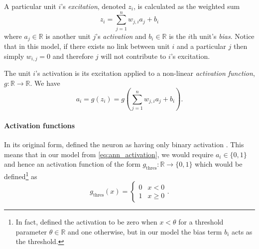 A particular unit $i$'s \textit{excitation}, denoted $z_i$, is calculated as the weighted sum
\begin{equation}
    z_i = \sum_{j=1}^n{w_{j,i} a_j} + b_i
\end{equation}
where $a_j \in \mathbb{R}$ is another unit $j$'s \textit{activation} and $b_i \in \mathbb{R}$ is the $i$th unit's \textit{bias}.
Notice that in this model, if there exists no link between unit $i$ and a particular $j$ then simply $w_{i,j}=0$ and therefore $j$ will not contribute to $i$'s excitation. 

The unit $i$'s activation is its excitation applied to a non-linear \textit{activation function}, $g: \mathbb{R} \rightarrow \mathbb{R}$. We have
\begin{equation}
    \label{eq:ann_activation}
    a_i = g\left(z_i\right) = g\left(\sum_{j=1}^n{w_{j,i} a_j} + b_i\right).
\end{equation}

\paragraph{Activation functions}
In its original form, \citeauthor{mcculloch1943} defined the neuron as having only binary activation \cite*{mcculloch1943}. 
This means that in our model from \ref{eq:ann_activation}, we would require $a_i \in \{0, 1\}$ and hence an activation function of the form $g_\text{thres}: \mathbb{R} \rightarrow \{0, 1\}$ which would be defined\footnote{In fact, \citeauthor{mcculloch1943} defined the activation to be zero when $x<\theta$ for a threshold parameter $\theta \in \mathbb{R}$ and one otherwise, but in our model the bias term $b_i$ acts as the threshold.} as
\begin{equation}
    \label{eq:thres_activation}
    g_\text{thres}(x) = \begin{cases} 
        0 & x < 0 \\
        1 & x \geq 0
    \end{cases}.
\end{equation}

